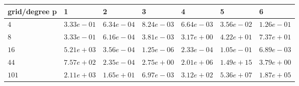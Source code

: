 \begin{tabular}{lllllll}
\hline
 grid/degree p   & 1          & 2          & 3          & 4          & 5          & 6          \\
\hline
 $4$             & $3.33e-01$ & $6.34e-04$ & $8.24e-03$ & $6.64e-03$ & $3.56e-02$ & $1.26e-01$ \\
 $8$             & $3.33e-01$ & $6.16e-04$ & $3.81e-03$ & $3.17e+00$ & $4.22e+01$ & $7.37e+01$ \\
 $16$            & $5.21e+03$ & $3.56e-04$ & $1.25e-06$ & $2.33e-04$ & $1.05e-01$ & $6.89e-03$ \\
 $44$            & $7.57e+02$ & $2.35e-04$ & $2.75e+00$ & $2.01e+06$ & $1.49e+15$ & $3.79e+00$ \\
 $101$           & $2.11e+03$ & $1.65e+01$ & $6.97e-03$ & $3.12e+02$ & $5.36e+07$ & $1.87e+05$ \\
\hline
\end{tabular}